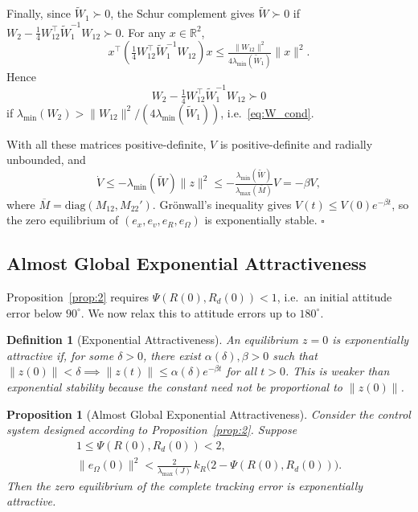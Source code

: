 \documentclass[11pt]{article}
\newtheorem{proposition}{Proposition}
\newtheorem{definition}{Definition}
\theoremstyle{remark}
\newcommand{\R}{\mathbb{R}}
\newcommand{\diag}{\mathrm{diag}}
\newcommand{\lmin}{\lambda_{\min}}
\newcommand{\lmax}{\lambda_{\max}}
\begin{document}
Finally, since $\widetilde W_1 \succ 0$, the Schur complement gives $\widetilde W \succ 0$ if $W_2 - \tfrac{1}{4}W_{12}^\top\widetilde W_1^{-1}W_{12} \succ 0$. For any $x \in \R^2$,
\[
x^\top\!\left(\tfrac{1}{4}W_{12}^\top\widetilde W_1^{-1}W_{12}\right)x \le \tfrac{\|W_{12}\|^2}{4\lmin(\widetilde W_1)}\|x\|^2.
\]
Hence
\begin{equation}
W_2 - \tfrac{1}{4}W_{12}^\top\widetilde W_1^{-1}W_{12} \succ 0
\label{eq:W_1_tilde_bound}
\end{equation}
if $\lmin(W_2) > \|W_{12}\|^2/(4\lmin(\widetilde W_1))$, i.e.\ \eqref{eq:W_cond}.

With all these matrices positive-definite, $V$ is positive-definite and radially unbounded, and
\[
\dot V \le -\lmin(\widetilde W)\|z\|^2 \le -\tfrac{\lmin(\widetilde W)}{\lmax(\overline M)}V = -\beta V,
\]
where $\overline M = \diag(M_{12}, M_{22}')$. Gr\"onwall's inequality gives $V(t) \le V(0)e^{-\beta t}$, so the zero equilibrium of $(e_x,e_v,e_R,e_\Omega)$ is exponentially stable. $\square$

\subsection{Almost Global Exponential Attractiveness}
\label{sec:prop3}

Proposition~\ref{prop:2} requires $\Psi(R(0),R_d(0)) < 1$, i.e.\ an initial attitude error below $90^\circ$. We now relax this to attitude errors up to $180^\circ$.

\begin{definition}[Exponential Attractiveness]
\label{def:exp_attractiveness}
An equilibrium $z=0$ is \emph{exponentially attractive} if, for some $\delta>0$, there exist $\alpha(\delta), \beta > 0$ such that $\|z(0)\| < \delta \implies \|z(t)\| \le \alpha(\delta)e^{-\beta t}$ for all $t>0$. This is weaker than exponential stability because the constant need not be proportional to $\|z(0)\|$.
\end{definition}

\begin{proposition}[Almost Global Exponential Attractiveness]
\label{prop:3}
Consider the control system designed according to Proposition~\ref{prop:2}. Suppose
\begin{align}
1 \le \Psi(R(0),R_d(0)) < 2, \label{eq:prop3_ic1}\\
\|e_\Omega(0)\|^2 < \tfrac{2}{\lmax(J)}\,k_R\bigl(2-\Psi(R(0),R_d(0))\bigr). \label{eq:prop3_ic2}
\end{align}
Then the zero equilibrium of the complete tracking error is exponentially attractive.
\end{proposition}
\end{document}
